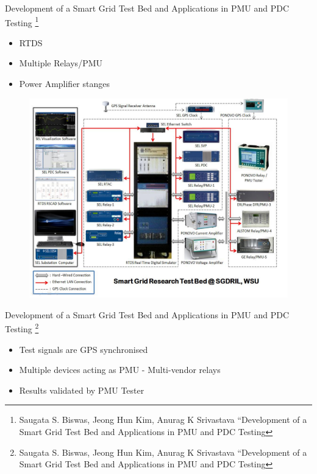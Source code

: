 \documentclass{beamer}
\begin{document}
\begin{frame}{\tiny{Development of a Smart Grid Test Bed and Applications in PMU and PDC Testing} \footnote{\tiny Saugata S. Biswas, Jeong Hun Kim, Anurag K Srivastava “Development of a Smart Grid Test Bed and Applications in PMU and PDC Testing} }
\begin{itemize}
\tiny
\item RTDS
\item Multiple Relays/PMU
\item Power Amplifier stanges 
\end{itemize}
\begin{figure}
\includegraphics[scale=0.27]{wsu_pmu_setup.png}
\end{figure}
\end{frame}


\begin{frame}{\tiny{Development of a Smart Grid Test Bed and Applications in PMU and PDC Testing} \footnote{\tiny Saugata S. Biswas, Jeong Hun Kim, Anurag K Srivastava “Development of a Smart Grid Test Bed and Applications in PMU and PDC Testing} }
\begin{itemize}
\item Test signals are GPS synchronised
\item Multiple devices acting as PMU - Multi-vendor relays
\item Results validated by PMU Tester
\end{itemize}
\end{frame}   
\end{document}
